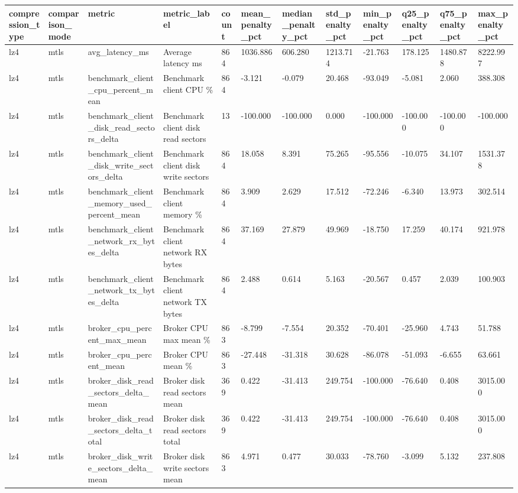 \begin{longtable}{llllllllllll}
\hline
compression\_type & comparison\_mode & metric & metric\_label & count & mean\_penalty\_pct & median\_penalty\_pct & std\_penalty\_pct & min\_penalty\_pct & q25\_penalty\_pct & q75\_penalty\_pct & max\_penalty\_pct \\
\hline
lz4 & mtls & avg\_latency\_ms & Average latency ms & 864 & 1036.886 & 606.280 & 1213.714 & -21.763 & 178.125 & 1480.878 & 8222.997 \\
lz4 & mtls & benchmark\_client\_cpu\_percent\_mean & Benchmark client CPU \% & 864 & -3.121 & -0.079 & 20.468 & -93.049 & -5.081 & 2.060 & 388.308 \\
lz4 & mtls & benchmark\_client\_disk\_read\_sectors\_delta & Benchmark client disk read sectors & 13 & -100.000 & -100.000 & 0.000 & -100.000 & -100.000 & -100.000 & -100.000 \\
lz4 & mtls & benchmark\_client\_disk\_write\_sectors\_delta & Benchmark client disk write sectors & 864 & 18.058 & 8.391 & 75.265 & -95.556 & -10.075 & 34.107 & 1531.378 \\
lz4 & mtls & benchmark\_client\_memory\_used\_percent\_mean & Benchmark client memory \% & 864 & 3.909 & 2.629 & 17.512 & -72.246 & -6.340 & 13.973 & 302.514 \\
lz4 & mtls & benchmark\_client\_network\_rx\_bytes\_delta & Benchmark client network RX bytes & 864 & 37.169 & 27.879 & 49.969 & -18.750 & 17.259 & 40.174 & 921.978 \\
lz4 & mtls & benchmark\_client\_network\_tx\_bytes\_delta & Benchmark client network TX bytes & 864 & 2.488 & 0.614 & 5.163 & -20.567 & 0.457 & 2.039 & 100.903 \\
lz4 & mtls & broker\_cpu\_percent\_max\_mean & Broker CPU max mean \% & 863 & -8.799 & -7.554 & 20.352 & -70.401 & -25.960 & 4.743 & 51.788 \\
lz4 & mtls & broker\_cpu\_percent\_mean & Broker CPU mean \% & 863 & -27.448 & -31.318 & 30.628 & -86.078 & -51.093 & -6.655 & 63.661 \\
lz4 & mtls & broker\_disk\_read\_sectors\_delta\_mean & Broker disk read sectors mean & 369 & 0.422 & -31.413 & 249.754 & -100.000 & -76.640 & 0.408 & 3015.000 \\
lz4 & mtls & broker\_disk\_read\_sectors\_delta\_total & Broker disk read sectors total & 369 & 0.422 & -31.413 & 249.754 & -100.000 & -76.640 & 0.408 & 3015.000 \\
lz4 & mtls & broker\_disk\_write\_sectors\_delta\_mean & Broker disk write sectors mean & 863 & 4.971 & 0.477 & 30.033 & -78.760 & -3.099 & 5.132 & 237.808 \\

\end{longtable}
